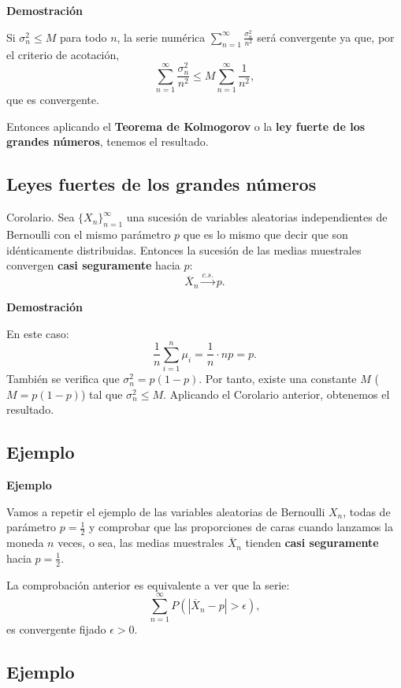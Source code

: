 \documentclass[]{book}
\begin{document}
\textbf{Demostración}

Si \(\sigma_n^2\leq M\) para todo \(n\), la serie numérica \(\sum\limits_{n=1}^\infty \frac{\sigma_n^2}{n^2}\) será convergente ya que, por el criterio de acotación,
\[
\sum\limits_{n=1}^\infty \frac{\sigma_n^2}{n^2}\leq M\sum\limits_{n=1}^\infty \frac{1}{n^2},
\]
que es convergente.

Entonces aplicando el \textbf{Teorema de Kolmogorov} o la \textbf{ley fuerte de los grandes números}, tenemos el resultado.

\hypertarget{leyes-fuertes-de-los-grandes-nuxfameros-3}{%
\subsection{Leyes fuertes de los grandes números}\label{leyes-fuertes-de-los-grandes-nuxfameros-3}}

 Corolario.
Sea \(\{X_n\}_{n=1}^\infty\) una sucesión de variables aleatorias independientes de Bernoulli con el mismo parámetro \(p\) que es lo mismo que decir que son idénticamente distribuidas.
Entonces la sucesión de las medias muestrales convergen \textbf{casi seguramente} hacia \(p\):
\[
\overline{X}_n \stackrel{c.s.}{\longrightarrow} p.
\]

\textbf{Demostración}

En este caso:
\[
\frac{1}{n}\sum_{i=1}^n \mu_i = \frac{1}{n}\cdot np=p.
\]
También se verifica que \(\sigma_n^2 =p(1-p)\). Por tanto, existe una constante \(M\) (\(M=p(1-p)\)) tal que \(\sigma_n^2\leq M\). Aplicando el Corolario anterior, obtenemos el resultado.

\hypertarget{ejemplo-149}{%
\subsection{Ejemplo}\label{ejemplo-149}}

\textbf{Ejemplo}

Vamos a repetir el ejemplo de las variables aleatorias de Bernoulli \(X_n\), todas de parámetro \(p=\frac{1}{2}\) y comprobar que las proporciones de caras cuando lanzamos la moneda \(n\) veces, o sea, las medias muestrales \(\overline{X}_n\) tienden \textbf{casi seguramente} hacia \(p=\frac{1}{2}\).

La comprobación anterior es equivalente a ver que la serie:
\[
\sum_{n=1}^\infty P(|\overline{X}_n-p|>\epsilon),
\]
es convergente fijado \(\epsilon >0\).

\hypertarget{ejemplo-150}{%
\subsection{Ejemplo}\label{ejemplo-150}}
\end{document}
